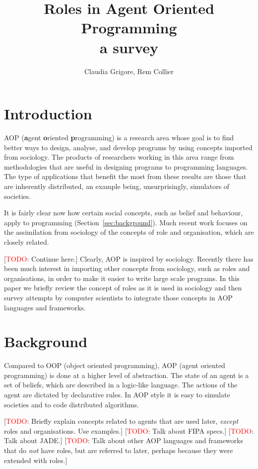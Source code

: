 \documentclass{article}
\title{Roles in Agent Oriented Programming\\\normalsize{a survey}}
\author{Claudia Grigore, Rem Collier}
\def\fb#1{\textbf{#1}}
\newcommand{\todo}[1]{[\textcolor{red}{TODO}: #1]}
\begin{document}
\maketitle

\begin{abstract}
\end{abstract}
\section{Introduction}

AOP (\fb agent \fb oriented \fb programming) is a research area
whose goal is to find better ways to design, analyse, and develop
programs by using concepts imported from sociology. The products
of researchers working in this area range from methodologies that
are useful in designing programs to programming languages. The
type of applications that benefit the most from these results
are those that are inherently distributed, an example being,
unsurprisingly, simulators of societies.

It is fairly clear now how certain social concepts,
such as belief and behaviour, apply to programming
(Section~\ref{sec:background}). Much recent work focuses on
the assimilation from sociology of the concepts of role and
organisation, which are closely related.

\todo{Continue here.}
Clearly, AOP is inspired by sociology. Recently there has been
much interest in importing other concepts from sociology, such
as roles and organisations, in order to make it easier to write
large scale programs. In this paper we briefly review the concept
of roles as it is used in sociology and then survey attempts by
computer scientists to integrate those concepts in AOP languages
and frameworks. 
\section{Background}

Compared to OOP (object oriented programming), AOP (agent oriented
programming) is done at a higher level of abstraction. The state of
an agent is a set of beliefs, which are described in a logic-like
language. The actions of the agent are dictated by declarative rules.
In AOP style it is easy to simulate societies and to code distributed
algorithms.

\todo{Briefly explain concepts related to agents that are used later,
  \emph{except} roles and organisations. Use examples.}
\todo{Talk about FIPA specs.}
\todo{Talk about JADE.}
\todo{Talk about other AOP languages and frameworks that do \emph{not}
  have roles, but are referred to later, perhaps because they were
  extended with roles.}
\end{document}
